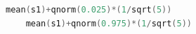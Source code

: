 \begin{lstlisting}[language=c++,label={code:20_05},caption={標本1の区間推定}]
    mean(s1)+qnorm(0.025)*(1/sqrt(5))
    mean(s1)+qnorm(0.975)*(1/sqrt(5))
\end{lstlisting}
